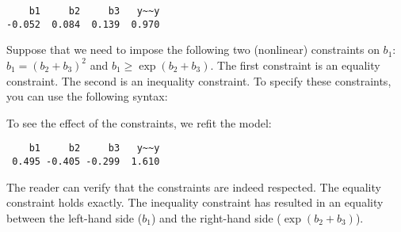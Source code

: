 \begin{Shaded}
\begin{Highlighting}[]
\NormalTok{(}\NormalTok{)}
\StringTok{ }\NormalTok{(} \NormalTok{(}\NormalTok{), }
                    \NormalTok{(}\NormalTok{), }
                    \NormalTok{(}\NormalTok{),}
                    \NormalTok{(}\NormalTok{))}
\StringTok{ }
\end{Highlighting}
\end{Shaded}

\begin{verbatim}
    b1     b2     b3   y~~y 
-0.052  0.084  0.139  0.970 
\end{verbatim}

Suppose that we need to impose the following two (nonlinear) constraints
on $b_1$: $b_1 = (b_2+b_3)^2$ and $b_1 \geq \exp(b_2 + b_3)$. The first
constraint is an equality constraint. The second is an inequality
constraint. To specify these constraints, you can use the following
syntax:

\begin{Shaded}
\begin{Highlighting}[]
\end{Highlighting}
\end{Shaded}

To see the effect of the constraints, we refit the model:

\begin{Shaded}
\begin{Highlighting}[]
\StringTok{ }
\end{Highlighting}
\end{Shaded}

\begin{verbatim}
    b1     b2     b3   y~~y 
 0.495 -0.405 -0.299  1.610 
\end{verbatim}

The reader can verify that the constraints are indeed respected. The
equality constraint holds exactly. The inequality constraint has
resulted in an equality between the left-hand side ($b_1$) and the
right-hand side ($\exp(b_2 + b_3)$).
